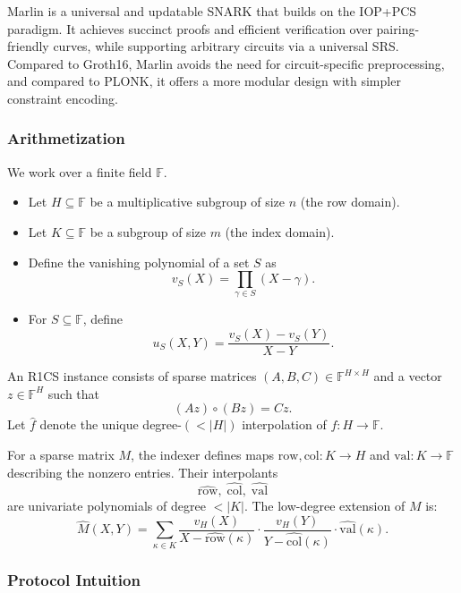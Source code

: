 Marlin is a universal and updatable SNARK
that builds on the IOP+PCS paradigm. 
It achieves succinct proofs and efficient verification over pairing-friendly curves, 
while supporting arbitrary circuits via a universal SRS. 
Compared to Groth16, Marlin avoids the need for circuit-specific preprocessing, 
and compared to PLONK, it offers a more modular design 
with simpler constraint encoding. 

\subsubsection*{Arithmetization}

We work over a finite field $\mathbb{F}$.

\begin{itemize}
    \item Let $H \subseteq \mathbb{F}$ be a multiplicative subgroup of size $n$ (the row domain).
    \item Let $K \subseteq \mathbb{F}$ be a subgroup of size $m$ (the index domain).
    \item Define the vanishing polynomial of a set $S$ as 
    \[
        v_S(X) = \prod_{\gamma \in S} (X - \gamma).
    \]
    \item For $S \subseteq \mathbb{F}$, define 
    \[
        u_S(X,Y) = \frac{v_S(X) - v_S(Y)}{X-Y}.
    \]
\end{itemize}

An R1CS instance consists of sparse matrices $(A,B,C) \in \mathbb{F}^{H \times H}$ and a vector $z \in \mathbb{F}^H$ such that
\[
    (Az) \circ (Bz) = Cz.
\]
Let $\hat f$ denote the unique degree-$(<|H|)$ interpolation of $f : H \to \mathbb{F}$.

For a sparse matrix $M$, the indexer defines maps $\mathrm{row}, \mathrm{col}:K\to H$ and $\mathrm{val}:K\to \mathbb{F}$ describing the nonzero entries. Their interpolants 
\[
    \widehat{\mathrm{row}}, \;\widehat{\mathrm{col}}, \;\widehat{\mathrm{val}}
\]
are univariate polynomials of degree $<|K|$. The low-degree extension of $M$ is:
\[
    \hat M(X,Y) = \sum_{\kappa \in K} 
        \frac{v_H(X)}{X-\widehat{\mathrm{row}}(\kappa)} \cdot
        \frac{v_H(Y)}{Y-\widehat{\mathrm{col}}(\kappa)} \cdot
        \widehat{\mathrm{val}}(\kappa).
\]


\subsubsection*{Protocol Intuition}

